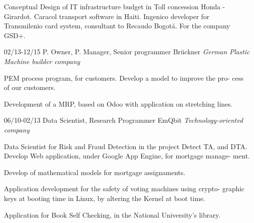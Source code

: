 \begin{entrylist}
{Conceptual Design of IT infrastructure budget in Toll concession Honda - Girardot. Caracol transport software in Haiti.
Ingenico developer for Transmilenio card system, consultant to Recaudo Bogotá. For the company GSD+.}

  \entry
	{02/13-12/15}
	{P. Owner, P. Manager, Senior programmer}
	{Brückner {\sl German Plastic Machine builder company}}
	{PEM process program, for customers. Develop a model to improve the pro-
cess of our customers.

	Development of a MRP, based on Odoo with application on stretching lines.}

  \entry
	{06/10-02/13}
	{Data Scientist, Research Programmer}
	{EmQbit {\sl Technology-oriented company}}
	{Data Scientist for Risk and Fraud Detection in the project Detect TA, and DTA.
Develop Web application, under Google App Engine, for mortgage manage-
ment.

Develop of mathematical models for mortgage assignaments.

Application development for the safety of voting machines using crypto-
graphic keys at booting time in Linux, by altering the Kernel at boot time.

	Application for Book Self Checking, in the National University’s library.}
\end{entrylist}

\newpage

